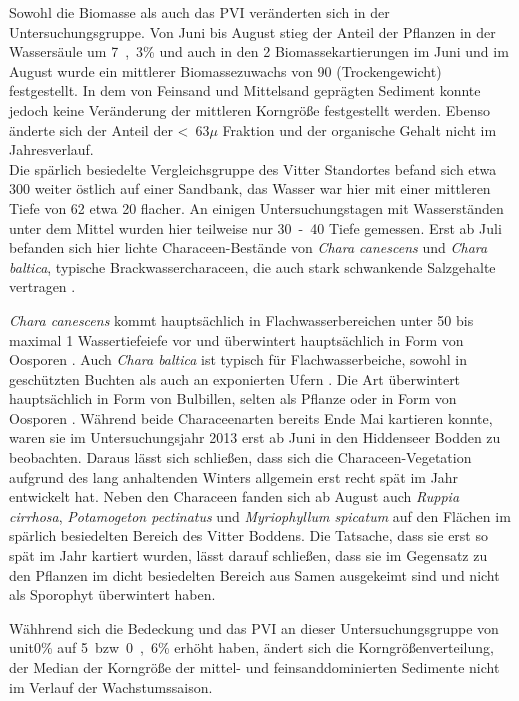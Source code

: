 Sowohl die Biomasse als auch das PVI veränderten sich in der Untersuchungsgruppe. Von Juni bis August stieg der Anteil der Pflanzen in der Wassersäule um \unit{7,3}{\%} und auch in den 2 Biomassekartierungen im Juni und im August wurde ein mittlerer Biomassezuwachs von \unit{90}{\gram\per\metre\squared} (Trockengewicht) festgestellt. 
In dem von Feinsand und Mittelsand geprägten Sediment konnte jedoch keine Veränderung der mittleren Korngröße festgestellt werden. Ebenso änderte sich der Anteil der \unit{<63}{$\mu$\metre} Fraktion und der organische Gehalt nicht im Jahresverlauf. 
\\
Die spärlich besiedelte Vergleichsgruppe des Vitter Standortes befand sich etwa \unit{300}{\metre} weiter östlich auf einer Sandbank, das Wasser war hier mit einer mittleren Tiefe von \unit{62}{\centi\metre} etwa \unit{20}{\centi\metre} flacher. An einigen Untersuchungstagen mit Wasserständen unter dem Mittel wurden hier teilweise nur \unit{30-40}{\centi\metre} Tiefe gemessen. Erst ab Juli befanden sich hier lichte Characeen-Bestände von \textit{Chara canescens} und \textit{Chara baltica}, typische Brackwassercharaceen, die auch stark schwankende Salzgehalte vertragen \citep{blindow_2003, blumel_2003}. 

\textit{Chara canescens} kommt hauptsächlich in Flachwasserbereichen unter \unit{50}{\centi\metre}  bis maximal \unit{1}{\metre} Wassertiefeiefe \citep{blindow_2003} vor und überwintert hauptsächlich in Form von Oosporen \cite{wahlstedt_1862}. Auch \textit{Chara baltica} ist typisch für Flachwasserbeiche, sowohl in geschützten Buchten als auch an exponierten Ufern \citep{blumel_2003}. Die Art überwintert hauptsächlich in Form von Bulbillen, selten als Pflanze oder in Form von Oosporen \cite{blumel_2003}. Während \cite{flugge_2004} beide Characeenarten  bereits Ende Mai kartieren konnte, waren sie im Untersuchungsjahr 2013 erst ab Juni in den Hiddenseer Bodden zu beobachten. Daraus lässt sich schließen, dass sich die Characeen-Vegetation aufgrund des lang anhaltenden Winters allgemein erst recht spät im Jahr entwickelt hat.
Neben den Characeen fanden sich ab August auch \textit{Ruppia cirrhosa}, \textit{Potamogeton pectinatus} und \textit{Myriophyllum spicatum} auf den Flächen im spärlich besiedelten Bereich des Vitter Boddens. Die Tatsache, dass sie erst so spät im Jahr kartiert wurden, lässt darauf schließen, dass sie im Gegensatz zu den Pflanzen im dicht besiedelten Bereich aus Samen ausgekeimt sind und nicht als Sporophyt überwintert haben.

Wähhrend sich die Bedeckung und das PVI an dieser Untersuchungsgruppe von unit{0}{\%} auf \unit{5 bzw. 0,6}{\%} erhöht haben, ändert sich die Korngrößenverteilung, der Median der Korngröße der mittel- und feinsanddominierten Sedimente nicht im Verlauf der Wachstumssaison.

